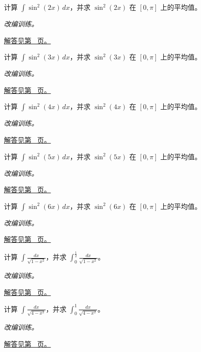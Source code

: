 \documentclass[UTF8,12pt,a4paper,fontset=fandol]{ctexart}
\begin{document}
\begin{example}[降幂公式与平均值]\label{ex:c14q8}
计算 $\displaystyle\int\sin^2(2x)\,dx$，并求 $\sin^2(2x)$ 在 $[0,\pi]$ 上的平均值。
\par\textit{改编训练。}\par\hyperref[ans:c14q8]{解答见第~\pageref{ans:c14q8} 页。}
\end{example}
\begin{example}[降幂公式与平均值]\label{ex:c14q9}
计算 $\displaystyle\int\sin^2(3x)\,dx$，并求 $\sin^2(3x)$ 在 $[0,\pi]$ 上的平均值。
\par\textit{改编训练。}\par\hyperref[ans:c14q9]{解答见第~\pageref{ans:c14q9} 页。}
\end{example}
\begin{example}[降幂公式与平均值]\label{ex:c14q10}
计算 $\displaystyle\int\sin^2(4x)\,dx$，并求 $\sin^2(4x)$ 在 $[0,\pi]$ 上的平均值。
\par\textit{改编训练。}\par\hyperref[ans:c14q10]{解答见第~\pageref{ans:c14q10} 页。}
\end{example}
\begin{example}[降幂公式与平均值]\label{ex:c14q11}
计算 $\displaystyle\int\sin^2(5x)\,dx$，并求 $\sin^2(5x)$ 在 $[0,\pi]$ 上的平均值。
\par\textit{改编训练。}\par\hyperref[ans:c14q11]{解答见第~\pageref{ans:c14q11} 页。}
\end{example}
\begin{example}[降幂公式与平均值]\label{ex:c14q12}
计算 $\displaystyle\int\sin^2(6x)\,dx$，并求 $\sin^2(6x)$ 在 $[0,\pi]$ 上的平均值。
\par\textit{改编训练。}\par\hyperref[ans:c14q12]{解答见第~\pageref{ans:c14q12} 页。}
\end{example}
\begin{example}[圆根式与三角换元]\label{ex:c14q13}
计算 $\displaystyle\int\frac{dx}{\sqrt{1-x^2}}$，并求 $\displaystyle\int_0^{\frac{1}{2}}\frac{dx}{\sqrt{1-x^2}}$。
\par\textit{改编训练。}\par\hyperref[ans:c14q13]{解答见第~\pageref{ans:c14q13} 页。}
\end{example}
\begin{example}[圆根式与三角换元]\label{ex:c14q14}
计算 $\displaystyle\int\frac{dx}{\sqrt{4-x^2}}$，并求 $\displaystyle\int_0^{1}\frac{dx}{\sqrt{4-x^2}}$。
\par\textit{改编训练。}\par\hyperref[ans:c14q14]{解答见第~\pageref{ans:c14q14} 页。}
\end{example}
\end{document}
